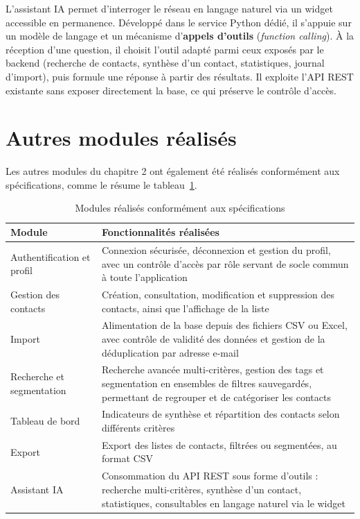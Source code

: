 L'assistant IA permet d'interroger le réseau en langage naturel via un widget accessible en permanence. Développé dans le service Python dédié, il s'appuie sur un modèle de langage et un mécanisme d'\textbf{appels d'outils} (\textit{function calling}). À la réception d'une question, il choisit l'outil adapté parmi ceux exposés par le backend (recherche de contacts, synthèse d'un contact, statistiques, journal d'import), puis formule une réponse à partir des résultats. Il exploite l'\acf{API} \acf{REST} existante sans exposer directement la base, ce qui préserve le contrôle d'accès.

\section{Autres modules réalisés}

Les autres modules du chapitre 2 ont également été réalisés conformément aux spécifications, comme le résume le tableau~\ref{tab:autres-modules}.

\begin{table}[H]
\centering
\small
\begin{tabularx}{\textwidth}{|l|X|}
\hline
\textbf{Module} & \textbf{Fonctionnalités réalisées} \\
\hline
Authentification et profil & Connexion sécurisée, déconnexion et gestion du profil, avec un contrôle d'accès par rôle servant de socle commun à toute l'application \\
\hline
Gestion des contacts & Création, consultation, modification et suppression des contacts, ainsi que l'affichage de la liste \\
\hline
Import & Alimentation de la base depuis des fichiers CSV ou Excel, avec contrôle de validité des données et gestion de la déduplication par adresse e-mail \\
\hline
Recherche et segmentation & Recherche avancée multi-critères, gestion des tags et segmentation en ensembles de filtres sauvegardés, permettant de regrouper et de catégoriser les contacts \\
\hline
Tableau de bord & Indicateurs de synthèse et répartition des contacts selon différents critères \\
\hline
Export & Export des listes de contacts, filtrées ou segmentées, au format CSV \\
\hline
Assistant IA & Consommation du \acf{API} REST sous forme d'outils : recherche multi-critères, synthèse d'un contact, statistiques, consultables en langage naturel via le widget \\
\hline
\end{tabularx}
\caption{Modules réalisés conformément aux spécifications}
\label{tab:autres-modules}
\end{table}

